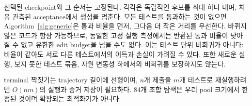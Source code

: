\documentclass[10pt,conference]{IEEEtran}
\begin{document}
선택된 checkpoint와 그 순서는 고정된다. 각각은 독립적인 후보를 최대 하나 내며, 처음 관측된 acceptance에서 생성을 멈춘다. 모든 테스트를 통과하는 것이 없으면 Algorithm~\ref{alg:generic}은 통과 비율을 먼저, 그다음 더 작은 거리를 우선한다. 바뀌지 않은 코드가 항상 가능하므로, 동일한 고정 실행 측정에서는 반환된 통과 비율이 낮아질 수 없고 유한한 edit budget을 넘을 수도 없다. 이는 테스트 단위 비회귀가 아니다: 비율이 같아도 서로 다른 테스트에서의 이득과 손실이 가려질 수 있다. 또한 새로운 실행, 보지 못한 테스트 묶음, 자원 변동성 하에서의 비회귀를 보장하지도 않는다.

terminal 짝짓기는 trajectory 길이에 선형이며, \(n\)개 제출을 \(m\)개 테스트로 재실행하려면 \(O(nm)\)의 실행과 증거 저장이 필요하다. 84개 조합 탐색은 우리 pool 크기에서 한정된 것이며 확장되는 최적화기가 아니다.
\end{document}
